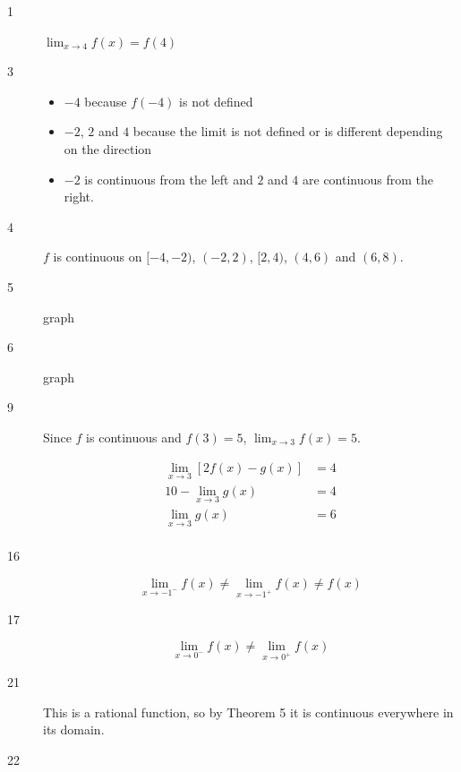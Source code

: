 \documentclass[letterpaper]{exam}
\begin{document}
    \begin{description}

      \item[1] $\lim_{x \to 4} f(x) = f(4)$

      \item[3] 
        \begin{itemize}
          \item $-4$ because $f(-4)$ is not defined

          \item $-2$, $2$ and $4$ because the limit is not defined or is different
            depending on the direction

          \item $-2$ is continuous from the left and $2$ and $4$ are continuous from the
            right.

        \end{itemize}

      \item[4] $f$ is continuous on $[-4, -2)$, $(-2, 2)$, $[2, 4)$, $(4, 6)$ 
          and $(6, 8)$.

      \item[5] graph

      \item[6] graph

      \item[9] Since $f$ is continuous and $f(3) = 5$, $\lim_{x \to 3} f(x) = 5$.

        \begin{align*}
          \lim_{x \to 3} \left[ 2 f(x) - g(x) \right] & = 4 \\
          10 - \lim_{x \to 3} g(x)                    & = 4 \\
          \lim_{x \to 3} g(x)                         & = 6 \\
        \end{align*}

      \item[16] 
        \[
          \lim_{x \to -1^-} f(x) \neq \lim_{x \to -1^+} f(x) \neq f(x)
        \]

      \item[17] 
        \[
          \lim_{x \to 0^-} f(x) \neq \lim_{x \to 0^+} f(x) 
        \]

      \item[21] This is a rational function, so by Theorem 5 it is continuous everywhere
        in its domain.

      \item[22] 
        

\end{description}
\end{document}

